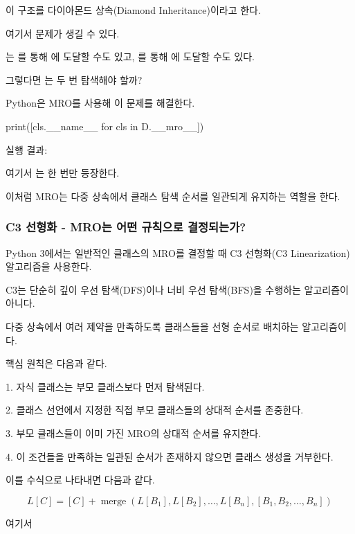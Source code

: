 이 구조를 다이아몬드 상속(Diamond Inheritance)이라고 한다.

여기서 문제가 생길 수 있다.

는 를 통해 에 도달할 수도 있고, 를 통해 에 도달할 수도 있다.

그렇다면 는 두 번 탐색해야 할까?

Python은 MRO를 사용해 이 문제를 해결한다.

\begin{dhkcode}
print([cls.__name__ for cls in D.__mro__])
\end{dhkcode}

실행 결과:

\begin{dhkzsh}
['D', 'B', 'C', 'A', 'object']
\end{dhkzsh}

여기서 는 한 번만 등장한다.

이처럼 MRO는 다중 상속에서 클래스 탐색 순서를 일관되게 유지하는 역할을 한다.

\subsubsection{C3 선형화 - MRO는 어떤 규칙으로 결정되는가?}

Python 3에서는 일반적인 클래스의 MRO를 결정할 때 C3 선형화(C3 Linearization) 알고리즘을 사용한다.

C3는 단순히 깊이 우선 탐색(DFS)이나 너비 우선 탐색(BFS)을 수행하는 알고리즘이 아니다.

다중 상속에서 여러 제약을 만족하도록 클래스들을 선형 순서로 배치하는 알고리즘이다.

핵심 원칙은 다음과 같다.

\begin{dhksmry}
1. 자식 클래스는 부모 클래스보다 먼저 탐색된다.

2. 클래스 선언에서 지정한 직접 부모 클래스들의 상대적 순서를 존중한다.

3. 부모 클래스들이 이미 가진 MRO의 상대적 순서를 유지한다.

4. 이 조건들을 만족하는 일관된 순서가 존재하지 않으면 클래스 생성을 거부한다.
\end{dhksmry}

이를 수식으로 나타내면 다음과 같다.

\[
L[C] =
[C] +
\operatorname{merge}
\left(
L[B_1],L[B_2],\ldots,L[B_n],
[B_1,B_2,\ldots,B_n]
\right)
\]

여기서

